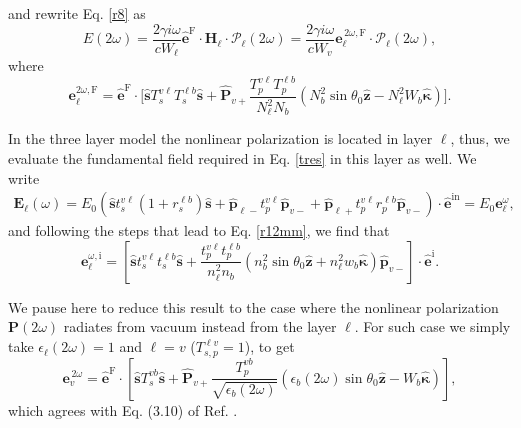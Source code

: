 and rewrite Eq. \eqref{r8} as
\begin{equation}\label{r10}
E(2\omega) =
\frac{2\gamma i \omega}{cW_{\ell}}
\hat{\mathbf{e}}^{\mathrm{F}}
\cdot
\mathbf{H}_{\ell}
\cdot
\boldsymbol{\mathcal{P}}_\ell(2\omega) 
= \frac{2\gamma i \omega}{cW_{v}}
\mathbf{e}^{\,2\omega,\mathrm{F}}_{\ell}
\cdot\boldsymbol{\mathcal{P}}_\ell(2\omega),
\end{equation}
where
\begin{equation}\label{r12mm}
\mathbf{e}^{2\omega,\mathrm{F}}_{\ell} =
\hat{\mathbf{e}}^{\mathrm{F}}\cdot 
\Bigg[
\hat{\mathbf{s}}T_{s}^{v\ell}T_{s}^{\ell b}\hat{\mathbf{s}} + 
\hat{\mathbf{P}}_{v+}
\frac{T^{v\ell}_{p}T^{\ell b}_{p}}
     {N^{2}_{\ell}N_{b}}
\left(
  N^{2}_{b}\sin\theta_{0}\hat{\mathbf{z}}
- N^{2}_{\ell}W_{b}\hat{\boldsymbol{\kappa}}
\right)
\Bigg].
\end{equation}

In the three layer model the nonlinear polarization is located in layer
$\ell$, thus, we evaluate the fundamental field required in Eq. \eqref{tres}
in this layer as well. We write
\begin{equation}\label{m2}
\begin{split}
\mathbf{E}_{\ell}(\omega)=E_0\left(
\hat{\mathbf{s}} t^{v\ell}_s(1+r^{\ell b}_s)\hat{\mathbf{s}}
+
\hat{\mathbf{p}}_{\ell-}
 t^{v\ell}_{p}
\hat{\mathbf{p}}_{v-}
+
\hat{\mathbf{p}}_{\ell+}
t^{v\ell}_{p}r^{\ell b}_{p}
\hat{\mathbf{p}}_{v-}
\right)\cdot\hat{\mathbf{e}}^{\mathrm{in}}=E_0\mathbf{e}^\omega_{\ell}
,
\end{split}
\end{equation} 
and following the steps that lead to Eq. \eqref{r12mm}, we find that
\begin{equation}\label{m12}
\mathbf{e}^{\omega,\mathrm{i}}_{\ell}
= \left[
\hat{\mathbf{s}}t_{s}^{v\ell}t_{s}^{\ell b}\hat{\mathbf{s}} 
+ \frac{t^{v\ell}_{p}t^{\ell b}_{p}}
       {n^{2}_{\ell}n_{b}}
\left(
  n^{2}_{b}\sin\theta_{0}\hat{\mathbf{z}}
+ n^{2}_{\ell}w_{b}\hat{\boldsymbol{\kappa}}
\right)
\hat{\mathbf{p}}_{v-}
\right]
\cdot\hat{\mathbf{e}}^{\mathrm{i}}.
\end{equation}

We pause here to reduce this result to the case where the nonlinear polarization
$\mathbf{P}(2\omega)$ radiates from vacuum instead from the layer $\ell$. For
such case we simply take $\epsilon_{\ell}(2\omega) = 1$ and $\ell = v$ ($T^{\ell
v}_{s,p} = 1$), to get
\begin{equation}\label{eq:r13}
\mathbf{e}^{\,2\omega}_{v} = \hat{\mathbf{e}}^{\mathrm{F}}\cdot
\left[
\hat{\mathbf{s}}T_{s}^{v b}\hat{\mathbf{s}} + \hat{\mathbf{P}}_{v+}
\frac{T^{v b}_{p}}{\sqrt{\epsilon_{b}(2\omega)}}
\left(
  \epsilon_{b}(2\omega)\sin\theta_{0}\hat{\mathbf{z}}
- W_{b}\hat{\boldsymbol{\kappa}}
\right) 
\right],
\end{equation}
which agrees with Eq. (3.10) of Ref. \cite{mizrahiJOSA88}.

